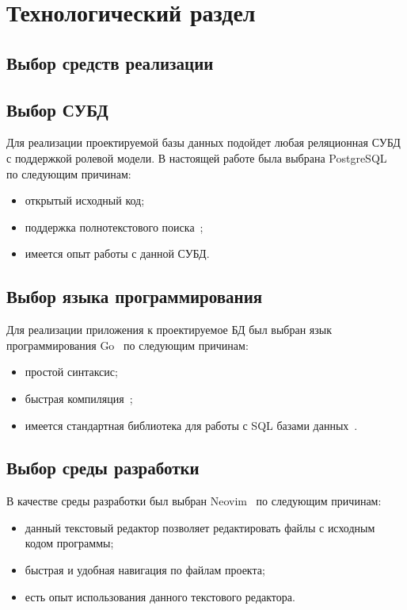 \section{Технологический раздел}

\subsection{Выбор средств реализации}

\subsection*{Выбор СУБД}

Для реализации проектируемой базы данных подойдет любая реляционная СУБД с поддержкой ролевой модели.
В настоящей работе была выбрана PostgreSQL~\cite{psql} по следующим причинам:
\begin{itemize}
    \item открытый исходный код;
    \item поддержка полнотекстового поиска~\cite{psql};
    \item имеется опыт работы с данной СУБД.
\end{itemize}

\subsection*{Выбор языка программирования}

Для реализации приложения к проектируемое БД был выбран язык программирования Go~\cite{go} по следующим причинам:
\begin{itemize}
    \item простой синтаксис;
    \item быстрая компиляция~\cite{go};
    \item имеется стандартная библиотека для работы с SQL базами данных~\cite{gosql}.
\end{itemize}

\subsection*{Выбор среды разработки}

В качестве среды разработки был выбран Neovim~\cite{nvim} по следующим причинам:
\begin{itemize}
    \item данный текстовый редактор позволяет редактировать файлы с исходным кодом программы;
    \item быстрая и удобная навигация по файлам проекта;
    \item есть опыт использования данного текстового редактора.
\end{itemize}

